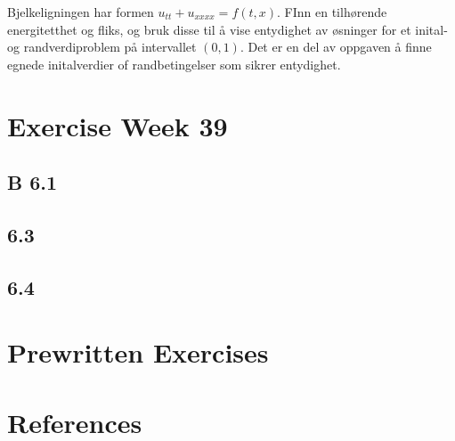 \documentclass{article}
\theoremstyle{remark}
\begin{document}
Bjelkeligningen har formen $u_{tt}+ u_{xxxx} = f\left( t,x \right)$. FInn en tilhørende energitetthet og fliks, og bruk disse til å vise entydighet av øsninger for et inital-og randverdiproblem på intervallet $\left( 0,1 \right)$. Det er en del av oppgaven å finne egnede initalverdier of randbetingelser som sikrer entydighet.

\newpage
\section{Exercise Week 39}%
\label{sec:exercise_week_39}

\subsection{B 6.1}%
\label{sub:b_6_1}

\subsection{6.3}%
\label{sub:6_3}

\subsection{6.4}%
\label{sub:6_4}








\newpage







\newpage

\section{Prewritten Exercises}%
\label{sec:prewritten_exercises}



\section{References}%
\label{sec:references}



\end{document}
